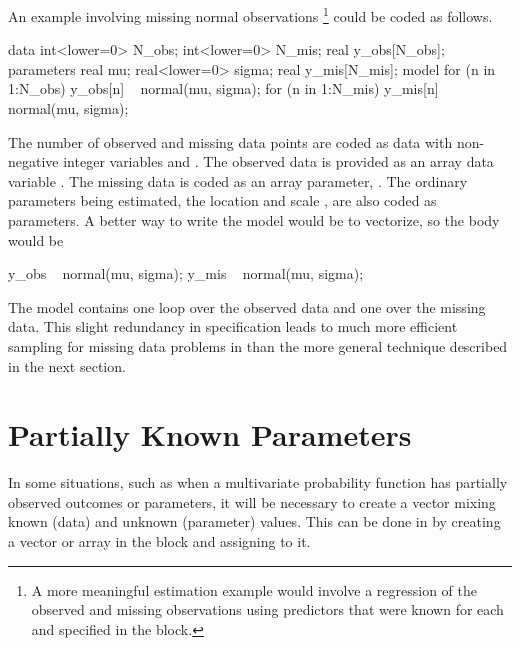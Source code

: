 An example involving missing normal observations%
%
\footnote{A more meaningful estimation example would involve a
  regression of the observed and missing observations using predictors
  that were known for each and specified in the  block.}
%
could be coded as follows.
%
\begin{stancode}
data {
  int<lower=0> N_obs;
  int<lower=0> N_mis;
  real y_obs[N_obs];
}
parameters {
  real mu;
  real<lower=0> sigma;
  real y_mis[N_mis];
}
model {
  for (n in 1:N_obs)
    y_obs[n] ~ normal(mu, sigma);
  for (n in 1:N_mis)
    y_mis[n] ~ normal(mu, sigma);
}
\end{stancode}
%
The number of observed and missing data points are coded as data with
non-negative integer variables  and .  The
observed data is provided as an array data variable .
The missing data is coded as an array parameter, .  The
ordinary parameters being estimated, the location  and scale
, are also coded as parameters.  A better way to write the
model would be to vectorize, so the body would be
%
\begin{stancode}
   y_obs ~ normal(mu, sigma);
   y_mis ~ normal(mu, sigma);
\end{stancode}

The model contains one loop over the observed data and one over the
missing data.  This slight redundancy in specification leads to much
more efficient sampling for missing data problems in \Stan than the
more general technique described in the next section.


\section{Partially Known Parameters}\label{partially-known-parameters.section}

In some situations, such as when a multivariate probability function
has partially observed outcomes or parameters, it will be necessary to
create a vector mixing known (data) and unknown (parameter) values.
This can be done in \Stan by creating a vector or array in the
 block and assigning to it.

